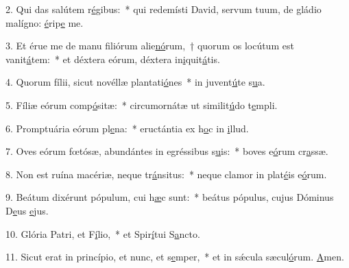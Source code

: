 2. Qui das salútem r\uline{é}gibus:~* qui redemísti David, servum tuum, de gládio malígno: \uline{é}rip\uline{e} me.\par 
3. Et érue me de manu filiórum alie\uline{nó}rum,~† quorum os locútum est vanit\uline{á}tem:~* et déxtera eórum, déxtera in\uline{i}quit\uline{á}tis.\par 
4. Quorum fílii, sicut novéllæ plantati\uline{ó}nes~* in juvent\uline{ú}te s\uline{u}a.\par 
5. Fíliæ eórum comp\uline{ó}sitæ:~* circumornátæ ut similit\uline{ú}do t\uline{e}mpli.\par 
6. Promptuária eórum pl\uline{e}na:~* eructántia ex h\uline{o}c in \uline{i}llud.\par 
7. Oves eórum fœtósæ, abundántes in egréssibus s\uline{u}is:~* boves e\uline{ó}rum cr\uline{a}ssæ.\par 
8. Non est ruína macériæ, neque tr\uline{á}nsitus:~* neque clamor in plat\uline{é}is e\uline{ó}rum.\par 
9. Beátum dixérunt pópulum, cui h\uline{æ}c sunt:~* beátus pópulus, cujus Dóminus D\uline{e}us \uline{e}jus.\par 
10. Glória Patri, et F\uline{í}lio,~* et Spir\uline{í}tui S\uline{a}ncto.\par 
11. Sicut erat in princípio, et nunc, et s\uline{e}mper,~* et in sǽcula sæcul\uline{ó}rum. \uline{A}men.\par 
